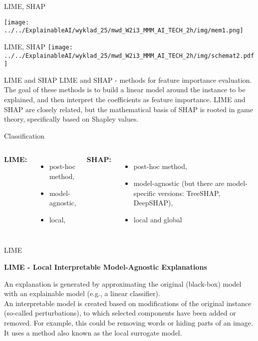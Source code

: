 \documentclass{beamer}
\begin{document}
\begin{frame}{LIME, SHAP}
\begin{center}
\texttt{[image: ../../ExplainableAI/wyklad\_25/mwd\_W2i3\_MMM\_AI\_TECH\_2h/img/mem1.png]} 
\end{center}
\end{frame}

\begin{frame}{LIME, SHAP}
\texttt{[image: ../../ExplainableAI/wyklad\_25/mwd\_W2i3\_MMM\_AI\_TECH\_2h/img/schemat2.pdf]} 
\end{frame}

\begin{frame}{LIME and SHAP}
LIME and SHAP - methods for feature importance evaluation. The goal of these methods is to build a linear model around the instance to be explained, and then interpret the coefficients as feature importance. LIME and SHAP are closely related, but the mathematical basis of SHAP is rooted in game theory, specifically based on Shapley values.
\end{frame}

\begin{frame}{Classification}
\begin{columns}
\textbf{LIME:}
\begin{itemize}
\item post-hoc method,
\item model-agnostic,
\item local,
\end{itemize}
\textbf{SHAP:}
\begin{itemize}
\item post-hoc method,
\item model-agnostic (but there are model-specific versions: TreeSHAP, DeepSHAP),
\item local and global
\end{itemize}
\end{columns}
\end{frame}

\begin{frame}{LIME}
\begin{center}
\textbf{LIME - Local Interpretable Model-Agnostic Explanations}
\end{center}
\bigskip
An explanation is generated by approximating the original (black-box) model with an explainable model (e.g., a linear classifier). \\
\bigskip
An interpretable model is created based on modifications of the original instance (so-called perturbations), to which selected components have been added or removed. For example, this could be removing words or hiding parts of an image. \\
\bigskip
It uses a method also known as the local surrogate model.
\end{frame}
\end{document}

